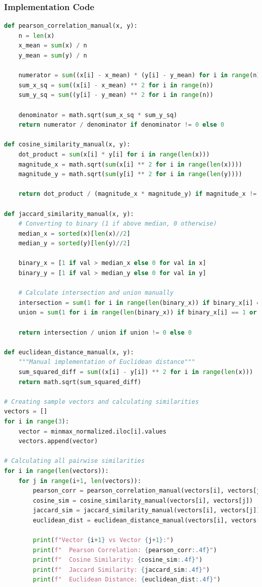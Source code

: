 \documentclass[12pt,a4paper]{article}
\begin{document}
\subsubsection{Implementation Code}
\begin{lstlisting}[language=Python, caption=Manual Similarity and Dissimilarity Measures]
def pearson_correlation_manual(x, y):
    n = len(x)
    x_mean = sum(x) / n
    y_mean = sum(y) / n
    
    numerator = sum((x[i] - x_mean) * (y[i] - y_mean) for i in range(n))
    sum_x_sq = sum((x[i] - x_mean) ** 2 for i in range(n))
    sum_y_sq = sum((y[i] - y_mean) ** 2 for i in range(n))
    
    denominator = math.sqrt(sum_x_sq * sum_y_sq)
    return numerator / denominator if denominator != 0 else 0

def cosine_similarity_manual(x, y):
    dot_product = sum(x[i] * y[i] for i in range(len(x)))
    magnitude_x = math.sqrt(sum(x[i] ** 2 for i in range(len(x))))
    magnitude_y = math.sqrt(sum(y[i] ** 2 for i in range(len(y))))
    
    return dot_product / (magnitude_x * magnitude_y) if magnitude_x != 0 and magnitude_y != 0 else 0

def jaccard_similarity_manual(x, y):
    # Converting to binary (1 if above median, 0 otherwise)
    median_x = sorted(x)[len(x)//2]
    median_y = sorted(y)[len(y)//2]
    
    binary_x = [1 if val > median_x else 0 for val in x]
    binary_y = [1 if val > median_y else 0 for val in y]
    
    # Calculate intersection and union manually
    intersection = sum(1 for i in range(len(binary_x)) if binary_x[i] == 1 and binary_y[i] == 1)
    union = sum(1 for i in range(len(binary_x)) if binary_x[i] == 1 or binary_y[i] == 1)
    
    return intersection / union if union != 0 else 0

def euclidean_distance_manual(x, y):
    """Manual implementation of Euclidean distance"""
    sum_squared_diff = sum((x[i] - y[i]) ** 2 for i in range(len(x)))
    return math.sqrt(sum_squared_diff)

# Creating sample vectors and calculating similarities
vectors = []
for i in range(3):
    vector = minmax_normalized.iloc[i].values
    vectors.append(vector)

# Calculating all pairwise similarities
for i in range(len(vectors)):
    for j in range(i+1, len(vectors)):
        pearson_corr = pearson_correlation_manual(vectors[i], vectors[j])
        cosine_sim = cosine_similarity_manual(vectors[i], vectors[j])
        jaccard_sim = jaccard_similarity_manual(vectors[i], vectors[j])
        euclidean_dist = euclidean_distance_manual(vectors[i], vectors[j])
        
        print(f"Vector {i+1} vs Vector {j+1}:")
        print(f"  Pearson Correlation: {pearson_corr:.4f}")
        print(f"  Cosine Similarity: {cosine_sim:.4f}")
        print(f"  Jaccard Similarity: {jaccard_sim:.4f}")
        print(f"  Euclidean Distance: {euclidean_dist:.4f}")
\end{lstlisting}
\end{document}
